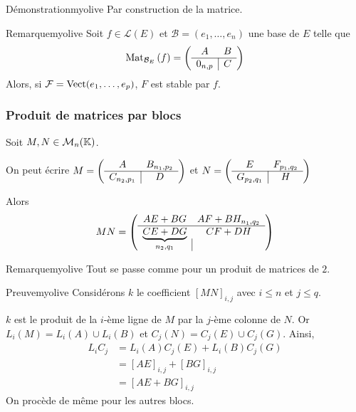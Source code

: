    \begin{demo}{Démonstration}{myolive}
        Par construction de la matrice.
    \end{demo}

    \begin{omed}{Remarque}{myolive}
        Soit $f \in \mathcal{L}(E)$ et $\mathcal{B} = (e_1,\ldots,e_n)$ une base de $E$ telle que 
        \[ \text{Mat}_{\mathcal{B}_E}\left(f\right) = \left( \begin{array}{c | c}
            A & B \\
            \hline 
            0_{n,p} & C 
        \end{array} \right) \]
        Alors, si $\mathcal{F} = \operatorname{Vect}(e_1,\ldots,e_p)$, $F$ est stable par $f$.
    \end{omed}

    \subsubsection{Produit de matrices par blocs}

    \begin{prop}{}{}
        Soit $M,N \in \mathcal{M}_{n}(\mathbb{K})$.

        On peut écrire $M = \left( \begin{array}{c | c}
            A & B_{n_1,p_2} \\
            \hline 
            C_{n_2, p_1} & D 
        \end{array} \right)$ 
        et 
        $N = \left( \begin{array}{c | c}
            E & F_{p_1, q_2} \\
            \hline 
            G_{p_2, q_1} & H 
        \end{array} \right)$

        Alors 
        \[ MN = \left( \begin{array}{c | c}
            AE + BG & AF + BH_{n_1,q_2} \\ 
            \hline 
            \underbrace{CE + DG}_{n_2,q_1} & CF+DH
        \end{array} \right) \]
    \end{prop}

    \begin{omed}{Remarque}{myolive}
        Tout se passe comme pour un produit de matrices de $2$.
    \end{omed}
    
    \begin{demo}{Preuve}{myolive}
        Considérons $k$ le coefficient $[MN]_{i,j}$ avec $i \leq n$ et $j \leq q$.
    
        $k$ est le produit de la $i$-ème ligne de $M$ par la $j$-ème colonne de $N$. Or $L_i(M) = L_i(A) \cup L_i(B)$ et $C_j(N) = C_j(E) \cup C_j(G)$. Ainsi,
        \begin{align*}
            L_i C_j 
            &= L_i(A) C_j(E) + L_i(B) C_j(G) \\
            &= [AE]_{i,j} + [BG]_{i,j} \\
            &= [AE + BG]_{i,j}
        \end{align*}
        On procède de même pour les autres blocs.
    \end{demo}

